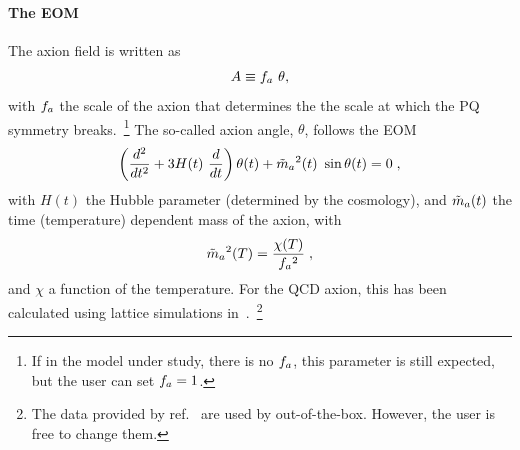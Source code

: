 \documentclass[11pt,a4paper]{article}
\begin{document}
\paragraph{The EOM} 
%
The axion field is written as 
%
\begin{equation}
	A  \equiv f_{a}{} \ \theta,
	\label{eq:fa_def}
\end{equation}
with $f_{a}{}$ the scale of the axion that determines the the scale at which the PQ symmetry breaks.~\footnote{If in the model under study, there is no $f_{a}{}$, this parameter is still expected, but the user can set $f_{a}{}=1$.} 
%
The so-called axion angle, $\theta$, follows the EOM 
%
\begin{equation}
	\left( \dfrac{d^2}{d t^2} + 3 H(t) \ \dfrac{d}{d t}  \right) \theta(t) + \tilde m_{a}{}^2(t) \ \sin \theta(t) = 0 \; ,
	\label{eq:eom}
\end{equation}
%
with $H(t)$ the Hubble parameter (determined by the cosmology), and $\tilde m_{a}{}(t)$  the time (temperature) dependent mass of the axion, with 
\begin{equation}
	\tilde m_{a}{}^2(T) = \dfrac{\chi(T)}{f_{a}{}^2}\;,
	\label{eq:axion_mass_def}
\end{equation} 
%
and $\chi$ a function of the temperature. For the QCD axion, this has been calculated using lattice simulations in~\cite{Borsanyi:2016ksw}.~\footnote{The data provided by ref.~\cite{Borsanyi:2016ksw} are used by  \mimes out-of-the-box. However, the user is free to change them.}
\end{document}
